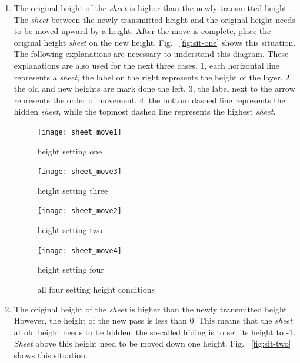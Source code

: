 \documentclass{swfcthesis}
\begin{document}
\begin{enumerate}
\item The original height of the \emph{sheet} is higher than the newly transmitted
  height. The \emph{sheet} between the newly transmitted height and the original height
  needs to be moved upward by a height. After the move is complete, place the original
  height \emph{sheet} on the new height. Fig. ~\ref{fig:sit-one} shows this situation.
  The following explanations are necessary to understand this diagram. These explanations
  are also used for the next three cases. 1, each horizontal line represents a
  \emph{sheet}, the label on the right represents the height of the layer. 2, the old and
  new heights are mark done the left. 3, the label next to the arrow represents the order
  of movement. 4, the bottom dashed line represents the hidden \emph{sheet}, while the
  topmost dashed line represents the highest \emph{sheet}.

  \begin{figure}
    \centering
    \begin{minipage}{0.45\textwidth}
        \centering
        \texttt{[image: sheet\_move1]} %
        \caption{height setting one}
        \label{fig:sit-one}
    \end{minipage}\hfill
    \begin{minipage}{0.45\textwidth}
      \centering
      \texttt{[image: sheet\_move3]} 
      \caption{height setting three}
      \label{fig:sit-three}
    \end{minipage}\hfill
    \begin{minipage}{0.45\textwidth}
      \centering
      \texttt{[image: sheet\_move2]} 
      \caption{height setting two}
      \label{fig:sit-two}
    \end{minipage}\hfill
    \begin{minipage}{0.45\textwidth}
      \centering
      \texttt{[image: sheet\_move4]} 
      \caption{height setting four}
      \label{fig:sit-four}
    \end{minipage}
    \caption{all four setting height conditions}
\end{figure}
  

\item The original height of the \emph{sheet} is higher than the newly transmitted
  height. However, the height of the new pass is less than 0. This means that the
  \emph{sheet} at old height needs to be hidden, the so-called hiding is to set its height
  to -1. \emph{Sheet} above this height need to be moved down one
  height. Fig. ~\ref{fig:sit-two} shows this situation.
  


\end{enumerate}
\end{document}
